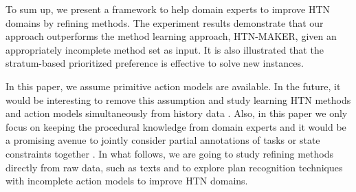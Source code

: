 \documentclass[letterpaper]{article} %
\begin{document}
To sum up, we present a framework to help domain experts to improve HTN domains by refining methods.
The experiment results demonstrate that our approach outperforms the method learning approach, HTN-MAKER, given an appropriately incomplete method set as input.
It is also illustrated that the stratum-based prioritized preference is effective to solve new instances.

In this paper, we assume primitive action models are available. In the future, it would be interesting to remove this assumption and study learning HTN methods and action models simultaneously from history data \cite{DBLP:journals/ai/Zhuo014,DBLP:journals/ai/AinetoCO19}.
Also, in this paper we only focus on keeping the procedural knowledge from domain experts and it would be a promising avenue to jointly consider partial annotations of tasks or state constraints together \cite{XiaoHPWS17htn,DBLP:conf/aaai/Munoz-AvilaDR19}.
In what follows, we are going to study refining methods directly from raw data, such as texts \cite{DBLP:conf/ijcai/FengZK18} %
and to explore plan recognition techniques with incomplete action models \cite{DBLP:journals/tist/Zhuo19} to improve HTN domains.

%
\end{document}
